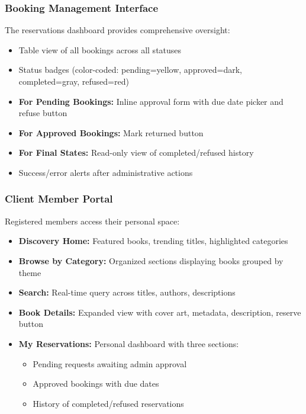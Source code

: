 \documentclass[12pt,a4paper]{article}
\begin{document}
\subsubsection{Booking Management Interface}

The reservations dashboard provides comprehensive oversight:

\begin{itemize}[leftmargin=*]
    \item Table view of all bookings across all statuses
    \item Status badges (color-coded: pending=yellow, approved=dark, completed=gray, refused=red)
    \item \textbf{For Pending Bookings:} Inline approval form with due date picker and refuse button
    \item \textbf{For Approved Bookings:} Mark returned button
    \item \textbf{For Final States:} Read-only view of completed/refused history
    \item Success/error alerts after administrative actions
\end{itemize}

\subsubsection{Client Member Portal}

Registered members access their personal space:

\begin{itemize}[leftmargin=*]
    \item \textbf{Discovery Home:} Featured books, trending titles, highlighted categories
    \item \textbf{Browse by Category:} Organized sections displaying books grouped by theme
    \item \textbf{Search:} Real-time query across titles, authors, descriptions
    \item \textbf{Book Details:} Expanded view with cover art, metadata, description, reserve button
    \item \textbf{My Reservations:} Personal dashboard with three sections:
    \begin{itemize}
        \item Pending requests awaiting admin approval
        \item Approved bookings with due dates
        \item History of completed/refused reservations
    \end{itemize}
\end{itemize}
\end{document}
